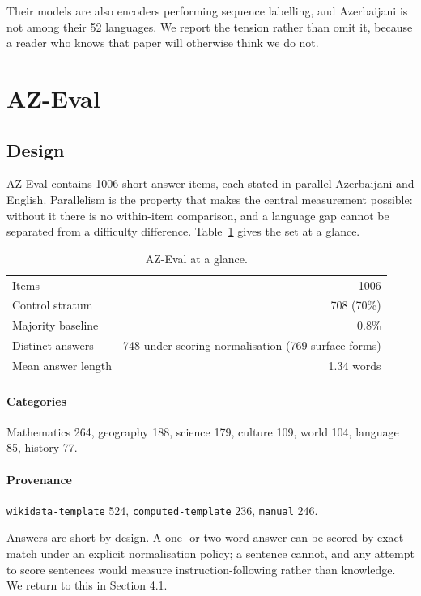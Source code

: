 \documentclass[final]{clv2025}
\begin{document}
Their models are also encoders performing sequence labelling, and Azerbaijani
is not among their 52 languages. We report the tension rather than omit it,
because a reader who knows that paper will otherwise think we do not.

\section{AZ-Eval}

\subsection{Design}

AZ-Eval contains 1006 short-answer items, each stated in parallel Azerbaijani
and English. Parallelism is the property that makes the central measurement
possible: without it there is no within-item comparison, and a language gap
cannot be separated from a difficulty difference. Table~\ref{tab:dataset}
gives the set at a glance.

\begin{table}[h!]
\caption{AZ-Eval at a glance.}
\label{tab:dataset}
\centering
\begin{tabular}{lr}
\toprule
Items & 1006 \\
Control stratum & 708 (70\%) \\
Majority baseline & 0.8\% \\
Distinct answers & 748 under scoring normalisation (769 surface forms) \\
Mean answer length & 1.34 words \\
\bottomrule
\end{tabular}
\end{table}

\paragraph{Categories} Mathematics 264, geography 188, science 179, culture
109, world 104, language 85, history 77.

\paragraph{Provenance} \texttt{wikidata-template} 524,
\texttt{computed-template} 236, \texttt{manual} 246.

Answers are short by design. A one- or two-word answer can be scored by exact
match under an explicit normalisation policy; a sentence cannot, and any
attempt to score sentences would measure instruction-following rather than
knowledge. We return to this in Section 4.1.
\end{document}
